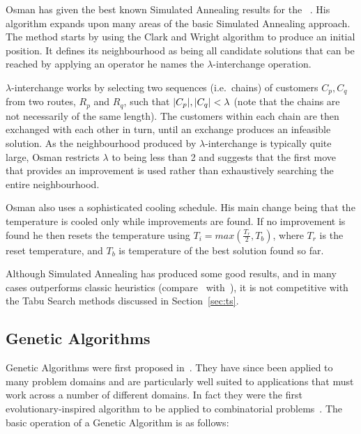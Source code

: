 Osman has given the best known Simulated Annealing results for the \VRP~\cite{Osman:1993}. His algorithm expands upon many areas of the basic Simulated Annealing approach. The method starts by using the Clark and Wright algorithm to produce an initial position. It defines its neighbourhood as being all candidate solutions that can be reached by applying an operator he names the $\lambda$-interchange operation.

$\lambda$-interchange works by selecting two sequences (i.e.~chains) of customers $C_p, C_q$ from two routes, $R_p$ and $R_q$, such that $|C_p|, |C_q| < \lambda$ (note that the chains are not necessarily of the same length). The customers within each chain are then exchanged with each other in turn, until an exchange produces an infeasible solution. As the neighbourhood produced by $\lambda$-interchange is typically quite large, Osman restricts $\lambda$ to being less than 2 and suggests that the first move that provides an improvement is used rather than exhaustively searching the entire neighbourhood.


Osman also uses a sophisticated cooling schedule. His main change being that the temperature is cooled only while improvements are found. If no improvement is found he then resets the temperature using $T_i = max(\frac{T_r}{2}, T_b)$, where $T_r$ is the reset temperature, and $T_b$ is temperature of the best solution found so far. 

Although Simulated Annealing has produced some good results, and in many cases outperforms classic heuristics (compare~\cite{Laporte:1999} with~\cite{GLP:1999}), it is not competitive with the Tabu Search methods discussed in Section~\ref{sec:ts}.

\subsection{Genetic Algorithms}

Genetic Algorithms were first proposed in~\cite{Holland:1975}. They have since been applied to many problem domains and are particularly well suited to applications that must work across a number of different domains. In fact they were the first evolutionary-inspired algorithm to be applied to combinatorial problems~\cite{Potvin:2009}. The basic operation of a Genetic Algorithm is as follows:

